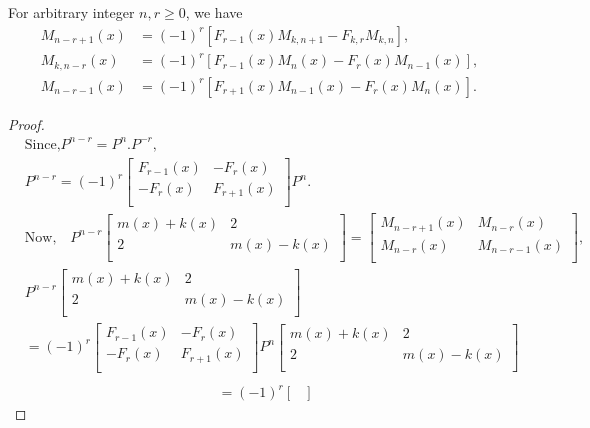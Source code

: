 \begin{theorem}For arbitrary integer $n,r\geq0$, we have
\begin{align*}
	M_{n-r+1}(x)&=(-1)^r\left[ F_{r-1}(x)M_{k,n+1}-F_{k,r}M_{k,n}\right] ,\\
	M_{k,n-r}(x)&=(-1)^r\left[ F_{r-1}(x)M_{n}(x)-F_{r}(x)M_{n-1}(x)\right] ,\\
	M_{n-r-1}(x)&=(-1)^r\left[ F_{r+1}(x)M_{n-1}(x)-F_{r}(x)M_{n}(x)\right] .
\end{align*}
\end{theorem}
\begin{proof}
\begin{align*}
&\text{Since,}
P^{n-r}=P^n.P^{-r},\\
&P^{n-r}=(-1)^r{
 \begin{bmatrix}
    F_{r-1}(x) & -F_{r}(x) \\
    -F_{r}(x) & F_{r+1}(x) \\
  \end{bmatrix}
}P^n.\\
&\text{Now,}\quad P^{n-r}{
 \begin{bmatrix}
    m(x)+k(x) & 2 \\
    2 & m(x)-k(x) \\
  \end{bmatrix}
}={
 \begin{bmatrix}
 		M_{n-r+1}(x) & M_{n-r}(x) \\
    M_{n-r}(x) & M_{n-r-1}(x)\\
  \end{bmatrix}
},\\
&P^{n-r}{
 \begin{bmatrix}
    m(x)+k(x) & 2 \\
    2 & m(x)-k(x) \\
  \end{bmatrix}
}\\&=(-1)^r{
 \begin{bmatrix}
    F_{r-1}(x) & -F_{r}(x) \\
    -F_{r}(x) & F_{r+1}(x) \\
  \end{bmatrix}
}P^n{
 \begin{bmatrix}
    m(x)+k(x) & 2 \\
    2 & m(x)-k(x) \\
  \end{bmatrix}
}\\
\end{align*}	
 \begin{align*}	
&=(-1)^r{
 \begin{bmatrix}

\end{bmatrix}}
\end{align*}
\end{proof}
